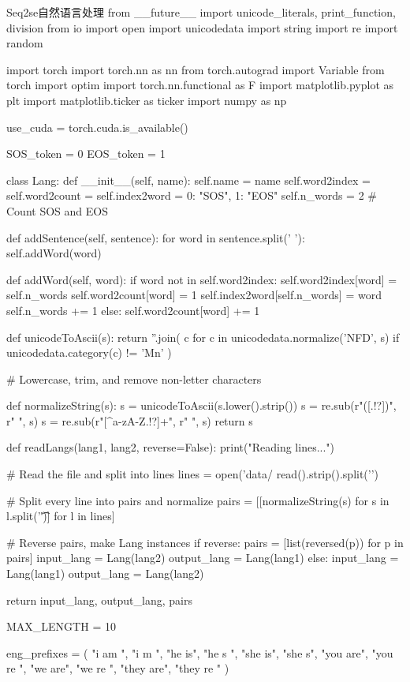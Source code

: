 \documentclass[openbib]{article}
\begin{document}
\begin{Python}{Seq2se自然语言处理}
from __future__ import unicode_literals, print_function, division
from io import open
import unicodedata
import string
import re
import random

import torch
import torch.nn as nn
from torch.autograd import Variable
from torch import optim
import torch.nn.functional as F
import matplotlib.pyplot as plt
import matplotlib.ticker as ticker
import numpy as np

use_cuda = torch.cuda.is_available()

SOS_token = 0
EOS_token = 1

class Lang:
	def __init__(self, name):
		self.name = name
		self.word2index = {}
		self.word2count = {}
		self.index2word = {0: "SOS", 1: "EOS"}
		self.n_words = 2  # Count SOS and EOS

	def addSentence(self, sentence):
		for word in sentence.split(' '):
			self.addWord(word)

	def addWord(self, word):
		if word not in self.word2index:
			self.word2index[word] = self.n_words
			self.word2count[word] = 1
			self.index2word[self.n_words] = word
			self.n_words += 1
		else:
			self.word2count[word] += 1

def unicodeToAscii(s):
	return ''.join(
			c for c in unicodedata.normalize('NFD', s)
			if unicodedata.category(c) != 'Mn'
			)
	
# Lowercase, trim, and remove non-letter characters

def normalizeString(s):
	s = unicodeToAscii(s.lower().strip())
	s = re.sub(r"([.!?])", r" \1", s)
	s = re.sub(r"[^a-zA-Z.!?]+", r" ", s)
	return s

def readLangs(lang1, lang2, reverse=False):
	print("Reading lines...")

# Read the file and split into lines
	lines = open('data/%
	read().strip().split('\n')

# Split every line into pairs and normalize
	pairs = [[normalizeString(s) for s in l.split('\t')] for l in lines]

# Reverse pairs, make Lang instances
	if reverse:
		pairs = [list(reversed(p)) for p in pairs]
		input_lang = Lang(lang2)
		output_lang = Lang(lang1)
	else:
		input_lang = Lang(lang1)
		output_lang = Lang(lang2)

	return input_lang, output_lang, pairs

MAX_LENGTH = 10

eng_prefixes = (
"i am ", "i m ",
"he is", "he s ",
"she is", "she s",
"you are", "you re ",
"we are", "we re ",
"they are", "they re "
)


\end{Python}
\end{document}
